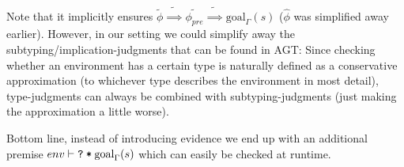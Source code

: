 \documentclass[11pt,a4paper]{article}
\newcommand{\ttt}{\texttt}
\newcommand{\grad}[1]{\widetilde{#1}}
\newcommand{\qm}{\ttt{?}}
\newcommand{\withqm}[1]{\ttt{\qm\:*\:$#1$}}
\newcommand{\goal}{\ensuremath{\textrm{goal}_{\Gamma}}}
\begin{document}
\begin{description}
	Note that it implicitly ensures $\grad{\phi} \grad{\implies} \grad{\phi_{pre}} \grad{\implies} \goal(s)$ ($\hat{\phi}$ was simplified away earlier).
	However, in our setting we could simplify away the subtyping/implication-judgments that can be found in AGT:
	Since checking whether an environment has a certain type is naturally defined as a conservative approximation (to whichever type describes the environment in most detail), type-judgments can always be combined with subtyping-judgments (just making the approximation a little worse).
	
	Bottom line, instead of introducing evidence we end up with an additional premise $env \vdash \withqm{\goal(s)}$ which can easily be checked at runtime.
\end{description}



\end{document}
